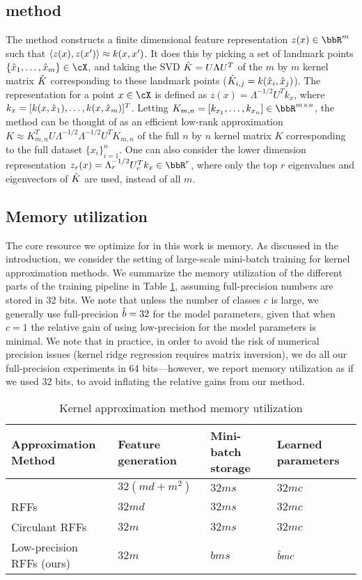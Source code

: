 \subsection{\Nystrom method}
The \Nystrom method constructs a finite dimensional feature representation
$z(x) \in \RR^m$ such that $\left\langle z(x),z(x')\right\rangle \approx k(x,x')$.  It does this
by picking a set of landmark points $\{\hx_1,\ldots,\hx_m\} \in \cX$,
and taking the SVD $\hat{K} = U\Lambda U^T$ of the $m$ by $m$ 
kernel matrix $\hat{K}$ corresponding to these landmark points 
($\hat{K}_{i,j} = k(\hat{x}_i,\hat{x}_j)$).  The \Nystrom representation for a point $x \in \cX$
is defined as $z(x) = \Lambda^{-1/2} U^T k_x$, where $k_x = [k(x,\hat{x}_1),\ldots,k(x,\hat{x}_m)]^T$.
Letting $K_{m,n} = [k_{x_1},\ldots,k_{x_n}] \in \RR^{m\times n}$, 
the \Nystrom method can be thought of as an efficient low-rank approximation
$K \approx K_{m,n}^T U \Lambda^{-1/2}\Lambda^{-1/2} U^T K_{m,n}$ of the full
$n$ by $n$ kernel matrix $K$ corresponding to the full dataset $\{x_i\}_{i=1}^n$.
One can also consider the lower dimension \Nystrom representation
$z_r(x) = \Lambda_r^{-1/2} U_r^T k_x \in \RR^r$, where only the top $r$ eigenvalues and
eigenvectors of $\hat{K}$ are used, instead of all $m$.

\subsection{Memory utilization}
\label{subsec:memory_utils}
The core resource we optimize for in this work is memory.  As discussed in the introduction, we consider the setting of large-scale mini-batch training for kernel approximation methods.  We summarize the memory utilization of the different parts of the training pipeline in Table \ref{table:mem-usage}, assuming full-precision numbers are stored in 32 bits. We note that unless the number of classes $c$ is large, we generally use full-precision $\hat{b} = 32$ for the model parameters, given that when $c=1$ the relative gain of using low-precision for the model parameters is minimal.  We note that in practice, in order to avoid the risk of numerical precision issues (kernel ridge regression requires matrix inversion), we do all our full-precision experiments in 64 bits---however, we report memory utilization as if we used 32 bits, to avoid inflating the relative gains from our method.

\begin{table}
	\caption{Kernel approximation method memory utilization}
	\label{table:mem-usage}
	\centering
	\begin{tabular}{llll}
		\toprule
		Approximation Method & Feature generation & Mini-batch storage & Learned parameters \\
		\midrule
		\Nystrom \citep{nystrom} & $32(md + m^2)$ & $32ms$ & $32mc$ \\
		RFFs \citep{rahimi07random} &  $32md$ & $32ms$ & $32mc$ \\
		Circulant RFFs \citep{yu15} & $32m$ & $32ms$ & $32mc$ \\
		Low-precision RFFs (ours)& $32m$ & $bms$ & $\hat{b} mc$ \\
		\bottomrule
	\end{tabular}
\end{table}

